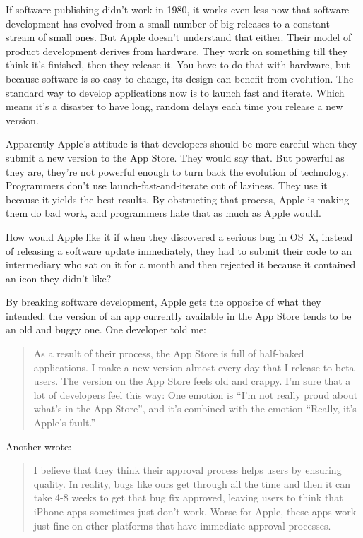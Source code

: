 \documentclass[12pt]{book}
\begin{document}
If software publishing didn't work in 1980, it works even less now that
software development has evolved from a small number of big releases to
a constant stream of small ones. But Apple doesn't understand that
either. Their model of product development derives from hardware. They
work on something till they think it's finished, then they release it.
You have to do that with hardware, but because software is so easy to
change, its design can benefit from evolution. The standard way to
develop applications now is to launch fast and iterate. Which means it's
a disaster to have long, random delays each time you release a new
version.

Apparently Apple's attitude is that developers should be more careful
when they submit a new version to the App Store. They would say that.
But powerful as they are, they're not powerful enough to turn back the
evolution of technology. Programmers don't use launch-fast-and-iterate
out of laziness. They use it because it yields the best results. By
obstructing that process, Apple is making them do bad work, and
programmers hate that as much as Apple would.

How would Apple like it if when they discovered a serious bug in OS~X,
instead of releasing a software update immediately, they had to submit
their code to an intermediary who sat on it for a month and then
rejected it because it contained an icon they didn't like?

By breaking software development, Apple gets the opposite of what they
intended: the version of an app currently available in the App Store
tends to be an old and buggy one. One developer told me:

\begin{quote}
As a result of their process, the App Store is full of half-baked
applications. I make a new version almost every day that I release to
beta users. The version on the App Store feels old and crappy. I'm sure
that a lot of developers feel this way: One emotion is ``I'm not really
proud about what's in the App Store'', and it's combined with the
emotion ``Really, it's Apple's fault.''
\end{quote}

Another wrote:

\begin{quote}
I believe that they think their approval process helps users by ensuring
quality. In reality, bugs like ours get through all the time and then it
can take 4-8 weeks to get that bug fix approved, leaving users to think
that iPhone apps sometimes just don't work. Worse for Apple, these apps
work just fine on other platforms that have immediate approval
processes.
\end{quote}
\end{document}
